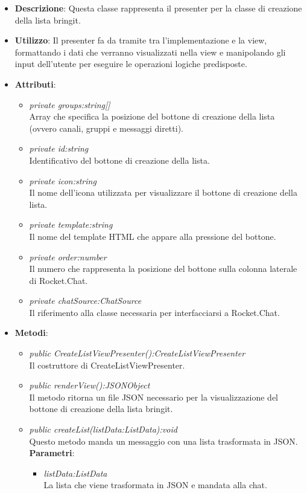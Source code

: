 \begin{itemize}
\item \textbf{Descrizione}: Questa classe rappresenta il presenter per la classe di creazione della lista bringit.
\item \textbf{Utilizzo}: Il presenter fa da tramite tra l'implementazione e la view, formattando i dati che verranno visualizzati nella view e manipolando gli input dell'utente per eseguire le operazioni logiche predisposte.
\item \textbf{Attributi}: 
	\begin{itemize}
	\item \textit{private groups:string[]}\\
	Array che specifica la posizione del bottone di creazione della lista (ovvero canali, gruppi e messaggi diretti).
	\item \textit{private id:string}\\
	Identificativo del bottone di creazione della lista.
	\item \textit{private icon:string}\\
	Il nome dell'icona utilizzata per visualizzare il bottone di creazione della lista.
	\item \textit{private template:string}\\
	Il nome del template HTML che appare alla pressione del bottone.
	\item \textit{private order:number}\\
	Il numero che rappresenta la posizione del bottone sulla colonna laterale di Rocket.Chat.
	\item \textit{private chatSource:ChatSource}\\
	Il riferimento alla classe necessaria per interfacciarsi a Rocket.Chat.
	\end{itemize}
\item \textbf{Metodi}:
	\begin{itemize}
	\item \textit{public CreateListViewPresenter():CreateListViewPresenter}\\
	Il costruttore di CreateListViewPresenter.
	\item \textit{public renderView():JSONObject}\\
	Il metodo ritorna un file JSON necessario per la visualizzazione del bottone di creazione della lista bringit.
	\item \textit{public createList(listData:ListData):void}\\
	Questo metodo manda un messaggio con una lista trasformata in JSON.
				\\ \textbf{Parametri}: \begin{itemize}
			\item \textit{listData:ListData}\\
			La lista che viene trasformata in JSON e mandata alla chat.
					\end{itemize} 
	\end{itemize}
\end{itemize} 
